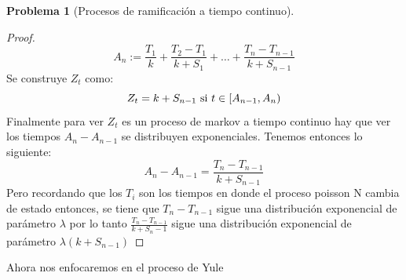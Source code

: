 \documentclass[a5paper,oneside]{amsart}
\theoremstyle{plain}
\theoremstyle{definition}
\newtheorem{problema}{Problema}
\begin{document}
\begin{problema}[Procesos de ramificaci\'on a tiempo continuo]
\begin{proof}
$$
A_n:= \frac{T_1}{k}+\frac{T_{2}-T_{1}}{k+S_{1}}+\ldots+\frac{T_{n}-T_{n-1}}{k+S_{n-1}}
$$
Se construye $Z_t$ como:
$$
Z_t=k+S_{n-1} \text{ si }  t \in \ensuremath\left[A_{n-1},A_n\right)
$$
Finalmente para ver $Z_t$ es un proceso de markov a tiempo continuo hay que ver los tiempos $A_n-A_{n-1}$ se distribuyen exponenciales. Tenemos entonces lo siguiente:
$$
A_n-A_{n-1}=\frac{T_n-T_{n-1}}{k+S_{n-1}}
$$
Pero recordando que los $T_i$ son los tiempos en donde el proceso poisson N cambia de estado entonces, se tiene que $T_n-T_{n-1}$ sigue una distribuci\'on exponencial de par\'ametro $\lambda$ por lo tanto  $\frac{T_n-T_{n-1}}{k+S_n-1}$ sigue una distribuci\'on exponencial de par\'ametro  $\lambda(k+S_{n-1})$




\end{proof}
Ahora nos enfocaremos en el proceso de Yule


\end{problema}
\end{document}
